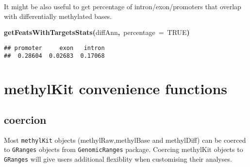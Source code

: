 \documentclass{article}
\makeatletter
\newcommand{\hlnumber}[1]{\textcolor[rgb]{0,0,0}{#1}}%
\newcommand{\hlfunctioncall}[1]{\textcolor[rgb]{.5,0,.33}{\textbf{#1}}}%
\newcommand{\hlkeyword}[1]{\textbf{#1}}%
\newcommand{\hlargument}[1]{\textcolor[rgb]{.69,.25,.02}{#1}}%
\newcommand{\hlsymbol}[1]{#1}%
\newenvironment{kframe}{%
 \def\FrameCommand##1{\hskip\@totalleftmargin \hskip-\fboxsep
 \colorbox{shadecolor}{##1}\hskip-\fboxsep
     \hskip-\linewidth \hskip-\@totalleftmargin \hskip\columnwidth}%
 \MakeFramed {\advance\hsize-\width
   \@totalleftmargin\z@ \linewidth\hsize
   \@setminipage}}%
 {\par\unskip\endMakeFramed}
\newenvironment{knitrout}{}{} %
\makeatother
\begin{document}
It might be also useful to get percentage of intron/exon/promoters that overlap with differentially methylated bases.

\begin{knitrout}
\color{fgcolor}\begin{kframe}
\begin{flushleft}
\ttfamily\noindent
\hlfunctioncall{getFeatsWithTargetsStats}\hlkeyword{(}\hlsymbol{diffAnn}\hlkeyword{,}{\ }\hlargument{percentage}{\ }\hlargument{=}{\ }\hlnumber{TRUE}\hlkeyword{)}\mbox{}
\normalfont
\end{flushleft}
\begin{verbatim}
## promoter     exon   intron 
##  0.28604  0.02683  0.17068 
\end{verbatim}
\end{kframe}
\end{knitrout}


\section{methylKit convenience functions}
\subsection{coercion}
Most \texttt{methylKit} objects (methylRaw,methylBase and methylDiff) can be coerced to \texttt{GRanges} objects from \texttt{GenomicRanges} package. Coercing methylKit objects to \texttt{GRanges} will give users additional flexiblity when customising their analyses.
\end{document}
